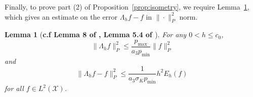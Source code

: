 \documentclass[twoside]{article}
\newcommand{\1}{\mathbf{1}}
\newcommand{\Xset}{\mathcal{X}}
\newcommand{\Leb}{L}
\newtheorem{lemma}{Lemma}
\theoremstyle{definition}
\theoremstyle{remark}
\begin{document}
Finally, to prove part (2) of Proposition~\ref{prop:isometry}, we require Lemma~\ref{lem:smoothening_error}, which gives an estimate on the error $\Lambda_h f - f$ in $\|\cdot\|_P^2$ norm.
\begin{lemma}[\textbf{c.f Lemma 8 of \citet{trillos2019}, Lemma 5.4 of \citet{burago2014}}]
	\label{lem:smoothening_error}
	For any $0 < h \leq c_0$, 
	\begin{equation}
	\label{eqn:smoothening_error_norm}
	\bigl\|\Lambda_hf\bigr\|_{P}^2 \leq \frac{p_{\max}}{a_3p_{\min}} \bigl\|f\bigr\|_{P}^2
	\end{equation}
	and
	\begin{equation}
	\label{eqn:smoothening_error_energy}
	\bigl\|\Lambda_hf - f\bigr\|_{P}^2 \leq \frac{1}{a_3\sigma_Kp_{\min}} h^2 E_h(f)
	\end{equation}
	for all $f \in \Leb^2(\Xset)$.
\end{lemma}
\end{document}
